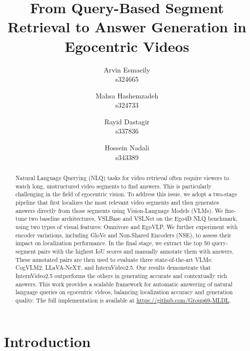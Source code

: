 \documentclass[10pt,twocolumn,letterpaper]{article}
\begin{document}
	
	\title{\textbf{From Query-Based Segment Retrieval to Answer Generation in Egocentric Videos}}
	
	
	
	\author{Arvin Esmaeily\\
		s324665\\
		\and
		Mahsa Hashemzadeh\\
		s324733\\
		\and
		Rayid Dastagir\\
		s337836\\
		\and
		Hossein Nadali\\
		s343389
	}
	
	\date{}
	\maketitle
	
	
	
	
	
\begin{abstract}
		
		
Natural Language Querying (NLQ) tasks for video retrieval often require viewers to watch long, unstructured video segments to find answers. This is particularly challenging in the field of egocentric vision. To address this issue, we adopt a two-stage pipeline that first localizes the most relevant video segments and then generates answers directly from those segments using Vision-Language Models (VLMs). We fine-tune two baseline architectures, VSLBase and VSLNet on the Ego4D NLQ benchmark, using two types of visual features: Omnivore and EgoVLP. We further experiment with encoder variations, including GloVe and Non-Shared Encoders (NSE), to assess their impact on localization performance. In the final stage, we extract the top 50 query-segment pairs with the highest IoU scores and manually annotate them with answers. These annotated pairs are then used to evaluate three state-of-the-art VLMs: CogVLM2, LLaVA-NeXT, and InternVideo2.5. Our results demonstrate that InternVideo2.5 outperforms the others in generating accurate and contextually rich answers. This work provides a scalable framework for automatic answering of natural language queries on egocentric videos, balancing localization accuracy and generation quality. The full implementation is available at \url{https://github.com/Group69-MLDL}.
\end{abstract}
	


\section{Introduction}
\end{document}
